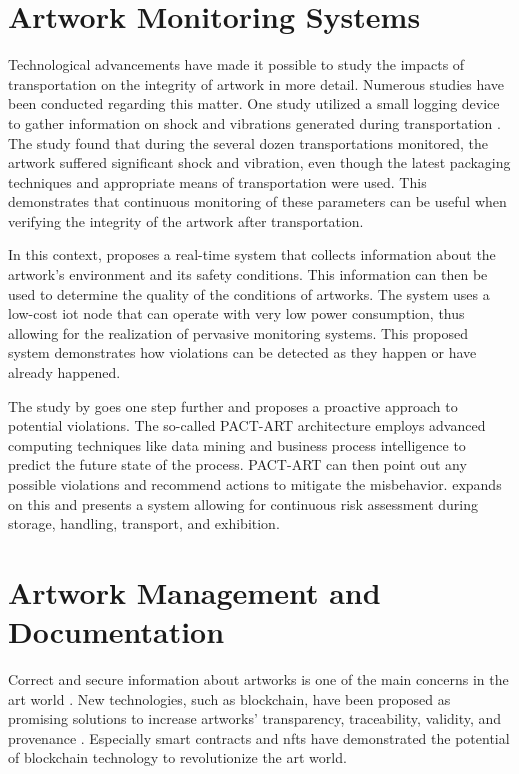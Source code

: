 \section{Artwork Monitoring Systems}
Technological advancements have made it possible to study the impacts of transportation on the integrity of artwork in more detail. Numerous studies have been conducted regarding this matter. One study utilized a small logging device to gather information on shock and vibrations generated during transportation \cite{shockvibrationtransit}. The study found that during the several dozen transportations monitored, the artwork suffered significant shock and vibration, even though the latest packaging techniques and appropriate means of transportation were used. This demonstrates that continuous monitoring of these parameters can be useful when verifying the integrity of the artwork after transportation.

In this context, \cite{woodenartworkmonitoring} proposes a real-time system that collects information about the artwork's environment and its safety conditions. This information can then be used to determine the quality of the conditions of artworks. The system uses a low-cost \gls{iot} node that can operate with very low power consumption, thus allowing for the realization of pervasive monitoring systems. This proposed system demonstrates how violations can be detected as they happen or have already happened. 

The study by \cite{pactart} goes one step further and proposes a proactive approach to potential violations. The so-called PACT-ART architecture employs advanced computing techniques like data mining and business process intelligence to predict the future state of the process. PACT-ART can then point out any possible violations and recommend actions to mitigate the misbehavior. \textcite{riskmonitoring} expands on this and presents a system allowing for continuous risk assessment during storage, handling, transport, and exhibition.

\section{Artwork Management and Documentation}
Correct and secure information about artworks is one of the main concerns in the art world \cite{bcartmarket}. New technologies, such as blockchain, have been proposed as promising solutions to increase artworks' transparency, traceability, validity, and provenance \cite{cyberartmarket}. Especially smart contracts and \glspl{nft} have demonstrated the potential of blockchain technology to revolutionize the art world. 

